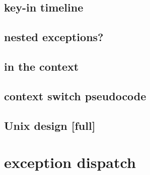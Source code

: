 \subsection{key-in timeline}


\subsection{nested exceptions?}


\subsection{in the context}


\subsection{context switch pseudocode}


\subsection{Unix design [full]}


\section{exception dispatch}



